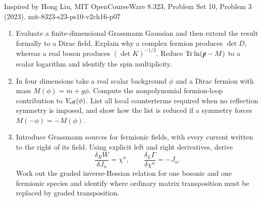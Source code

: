 \begin{enumerate}
  {Inspired by Hong Liu, MIT OpenCourseWare 8.323, Problem Set 10, Problem 3 (2023).}
  {mit-8323-s23-ps10-v2ch16-p07}
  \begin{enumerate}
    \item[(a)]
    Evaluate a finite-dimensional Grassmann Gaussian and then extend the
    result formally to a Dirac field.  Explain why a complex fermion produces
    \(\det D\), whereas a real boson produces \((\det K)^{-1/2}\).  Reduce
    \(\operatorname{Tr}\ln(\slashed p-M)\) to a scalar logarithm and identify
    the spin multiplicity.
    \item[(b)]
    In four dimensions take a real scalar background \(\phi\) and a Dirac
    fermion with mass \(M(\phi)=m+y\phi\).  Compute the nonpolynomial
    fermion-loop contribution to \(V_{\rm eff}(\phi)\).  List all local
    counterterms required when no reflection symmetry is imposed, and show
    how the list is reduced if a symmetry forces \(M(-\phi)=-M(\phi)\).
    \item[(c)]
    Introduce Grassmann sources for fermionic fields, with every current
    written to the right of its field.  Using explicit left and right
    derivatives, derive
    \[
      \frac{\delta_R W}{\delta J_n}=\chi^n,\qquad
      \frac{\delta_L\Gamma}{\delta\chi^n}=-J_n.
    \]
    Work out the graded inverse-Hessian relation for one bosonic and one
    fermionic species and identify where ordinary matrix transposition must
    be replaced by graded transposition.
  \end{enumerate}


\end{enumerate}
